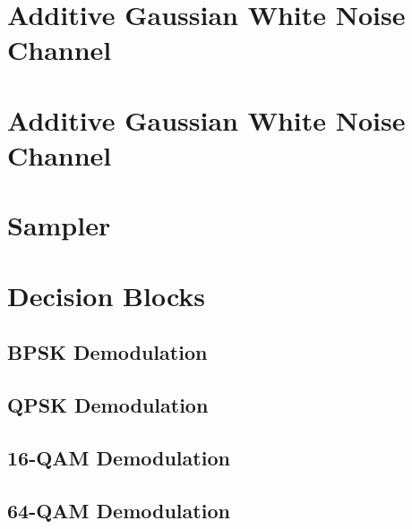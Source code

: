 \documentclass[]{article}
\begin{document}
\section{Additive Gaussian White Noise Channel}
\label{app:awgn_channel}

\cleardoublepage
\newpage

\section{Additive Gaussian White Noise Channel}
\label{app:awgn_channel}

\cleardoublepage
\newpage

\section{Sampler}
\label{app:sampler}

\cleardoublepage
\newpage

\section{Decision Blocks}
\label{app:dblocks}
\subsection{BPSK Demodulation}
\label{app:bpsk_demod}

\cleardoublepage
\newpage

\subsection{QPSK Demodulation}
\label{app:qpsk_demod}

\cleardoublepage
\newpage

\subsection{16-QAM Demodulation}
\label{app:qam_16_demod}

\cleardoublepage
\newpage

\subsection{64-QAM Demodulation}
\label{app:qam_64_demod}

\cleardoublepage
\newpage
\end{document}
